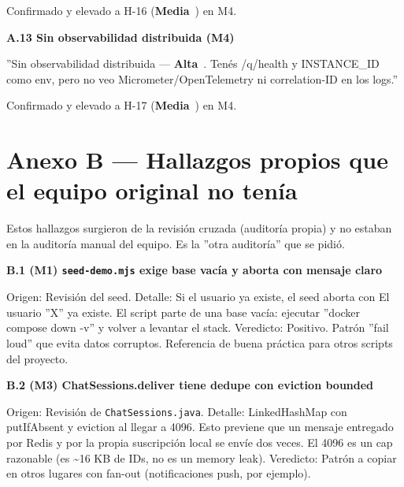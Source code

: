 \documentclass[10pt,a4paper]{article}
\newcommand{\code}[1]{\nolinkurl{#1}}
\newcommand{\badgeAlta}{\colorbox{orange!20}{\textcolor{orange!90!black}{\textbf{\footnotesize Alta}}}}
\newcommand{\badgeMedia}{\colorbox{yellow!35}{\textcolor{brown!90!black}{\textbf{\footnotesize Media}}}}
\begin{document}
Confirmado y elevado a H-16 (\badgeMedia\ ) en M4.\par\vspace{0.4em}
\vspace{0.6em}\noindent\textbf{\normalsize A.13 Sin observabilidad distribuida (M4)}\par\vspace{0.2em}
''Sin observabilidad distribuida --- \badgeAlta\ . Tenés /q/health y INSTANCE\_ID como env, pero no veo Micrometer/OpenTelemetry ni correlation-ID en los logs.''\par\vspace{0.4em}
Confirmado y elevado a H-17 (\badgeMedia\ ) en M4.\par\vspace{0.4em}
\section*{Anexo B --- Hallazgos propios que el equipo original no tenía}
Estos hallazgos surgieron de la revisión cruzada (auditoría propia) y no estaban en la auditoría manual del equipo. Es la ''otra auditoría'' que se pidió.\par\vspace{0.4em}
\vspace{0.6em}\noindent\textbf{\normalsize B.1 (M1) \code{seed-demo.mjs} exige base vacía y aborta con mensaje claro}\par\vspace{0.2em}
Origen: Revisión del seed.  Detalle: Si el usuario ya existe, el seed aborta con El usuario ''X'' ya existe. El script parte de una base vacía: ejecutar ''docker compose down -v'' y volver a levantar el stack.  Veredicto: Positivo. Patrón ''fail loud'' que evita datos corruptos. Referencia de buena práctica para otros scripts del proyecto.\par\vspace{0.4em}
\vspace{0.6em}\noindent\textbf{\normalsize B.2 (M3) ChatSessions.deliver tiene dedupe con eviction bounded}\par\vspace{0.2em}
Origen: Revisión de \code{ChatSessions.java}.  Detalle: LinkedHashMap con putIfAbsent y eviction al llegar a 4096. Esto previene que un mensaje entregado por Redis y por la propia suscripción local se envíe dos veces. El 4096 es un cap razonable (es \textasciitilde{}16 KB de IDs, no es un memory leak).  Veredicto: Patrón a copiar en otros lugares con fan-out (notificaciones push, por ejemplo).\par\vspace{0.4em}
\end{document}
